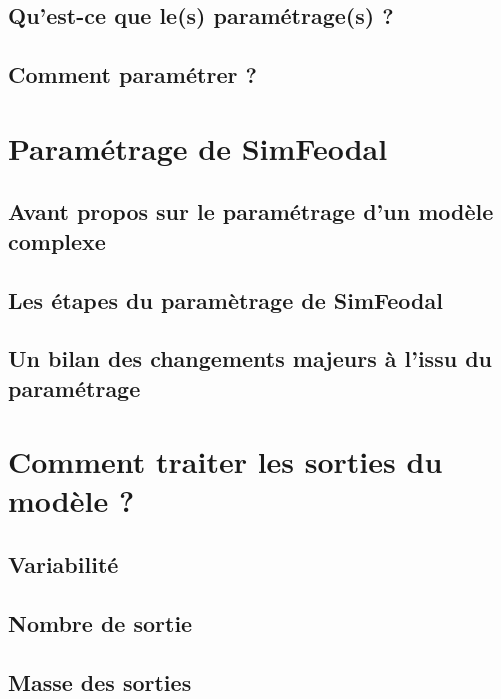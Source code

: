 \documentclass[12pt, a4paper, oneside]{book}
\begin{document}
	\subsection{Qu'est-ce que le(s) paramétrage(s) ?}
	\subsection{Comment paramétrer ?}
	
	
	
	
	
%	
	\section{Paramétrage de SimFeodal}
	\subsection{Avant propos sur le paramétrage d'un modèle complexe}
	\subsection{Les étapes du paramètrage de SimFeodal}
	\subsection{Un bilan des changements majeurs à l'issu du paramétrage}
	
	
%	
	\section{Comment traiter les sorties du modèle ?}
	\subsection{Variabilité}
	\subsection{Nombre de sortie}
	\subsection{Masse des sorties}

	
	
\end{document}
